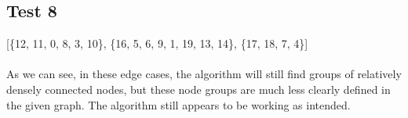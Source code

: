 \documentclass{article}
\begin{document}
\subsection{Test 8}
    \begin{center}
    \end{center}
    [\{12, 11, 0, 8, 3, 10\}, \{16, 5, 6, 9, 1, 19, 13, 14\}, \{17, 18, 7, 4\}]
\\ \\
As we can see, in these edge cases, the algorithm will still find groups of relatively densely connected nodes, but these node groups are much less clearly defined in the given graph.  The algorithm still appears to be working as intended.
\end{document}
